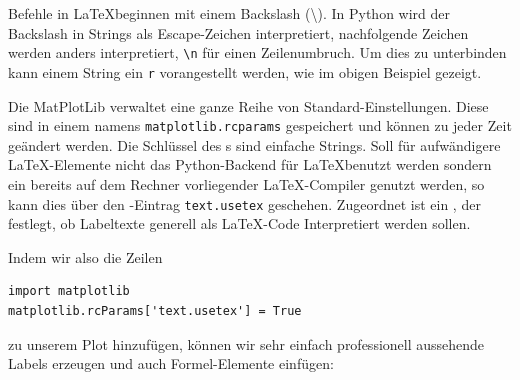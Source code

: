 \begin{hintbox}
Befehle in \LaTeX beginnen mit einem Backslash (\textbackslash). In Python wird der Backslash in Strings als Escape-Zeichen interpretiert, \ie nachfolgende Zeichen werden anders interpretiert, \eg \texttt{\textbackslash n} für einen Zeilenumbruch. Um dies zu unterbinden kann einem String ein \texttt{r} vorangestellt werden, wie im obigen Beispiel gezeigt.
\end{hintbox}

Die MatPlotLib verwaltet eine ganze Reihe von Standard-Einstellungen. Diese sind in einem  namens \texttt{matplotlib.rcparams} gespeichert und können zu jeder Zeit geändert werden. Die Schlüssel des s sind einfache Strings. Soll für aufwändigere \LaTeX-Elemente nicht das Python-Backend für \LaTeX benutzt werden sondern ein bereits auf dem Rechner vorliegender \LaTeX-Compiler genutzt werden, so kann dies über den -Eintrag \texttt{text.usetex} geschehen. Zugeordnet ist ein , der festlegt, ob Labeltexte generell als \LaTeX-Code Interpretiert werden sollen. 

Indem wir also die Zeilen
\begin{verbatim}
import matplotlib
matplotlib.rcParams['text.usetex'] = True
\end{verbatim}
zu unserem Plot hinzufügen, können wir sehr einfach professionell aussehende Labels erzeugen und auch Formel-Elemente einfügen:

